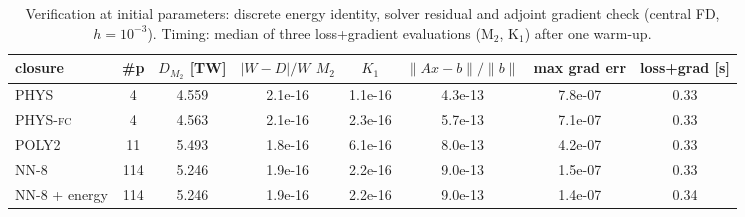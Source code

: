 \begin{table}[t]\centering\footnotesize
\caption{Verification at initial parameters: discrete energy identity, solver residual and adjoint gradient check (central FD, $h=10^{-3}$). Timing: median of three loss+gradient evaluations (M$_2$, K$_1$) after one warm-up.}
\label{tab:check}
\begin{tabular}{lccccccc}
\toprule
closure & \#p & $D_{M_2}$ [TW] & $|W-D|/W$ $M_2$ & $K_1$ & $\|A x-b\|/\|b\|$ & max grad err & loss+grad [s] \\
\midrule
\textsc{PHYS} & 4 & 4.559 & 2.1e-16 & 1.1e-16 & 4.3e-13 & 7.8e-07 & 0.33 \\
\textsc{PHYS-fc} & 4 & 4.563 & 2.1e-16 & 2.3e-16 & 5.7e-13 & 7.1e-07 & 0.33 \\
\textsc{POLY2} & 11 & 5.493 & 1.8e-16 & 6.1e-16 & 8.0e-13 & 4.2e-07 & 0.33 \\
\textsc{NN-8} & 114 & 5.246 & 1.9e-16 & 2.2e-16 & 9.0e-13 & 1.5e-07 & 0.33 \\
\textsc{NN-8} + energy & 114 & 5.246 & 1.9e-16 & 2.2e-16 & 9.0e-13 & 1.4e-07 & 0.34 \\
\bottomrule
\end{tabular}
\end{table}
